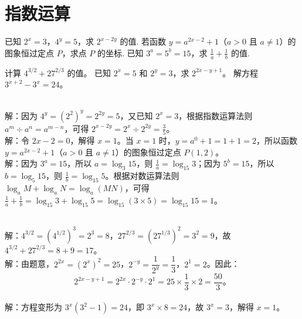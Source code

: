 \documentclass{ctexart}
\newenvironment{MyAnswer}[1][] %
{
    \begin{tcolorbox}[breakable, colframe=blue]
    \begin{Answer}[#1] \color{blue} \kaishu
        }  %
    {\end{Answer}
\end{tcolorbox}
}
\begin{document}


\section{指数运算}
\begin{Exercise}[title={指数运算小练习}, label={ex:exponent}]
    \Question 已知 $2^x = 3$，$4^y = 5$，求 $2^{x - 2y}$ 的值.
    \Question 若函数 $y = a^{2x - 2}+1$（$a>0$ 且 $a\neq1$）的图象恒过定点 $P$，求点 $P$ 的坐标.
    \Question 已知 $3^a = 5^b = 15$，求 $\frac{1}{a}+\frac{1}{b}$ 的值.

    \Question 计算 $4^{3/2} + 27^{2/3}$ 的值。
    \Question 已知 $2^x = 5$ 和 $2^y = 3$，求 $2^{2x - y + 1}$。
    \Question 解方程 $3^{x+2} - 3^x = 24$。
\end{Exercise}

\begin{MyAnswer}[ref={ex:exponent}]
    \Question {}\\ 解：因为 $4^y=(2^2)^y = 2^{2y}=5$，又已知 $2^x = 3$，根据指数运算法则 $a^m\div a^n=a^{m - n}$，可得 $2^{x - 2y}=2^x\div2^{2y}=\frac{3}{5}$。
    \Question {}\\ 解：令 $2x - 2 = 0$，解得 $x = 1$。当 $x = 1$ 时，$y=a^{0}+1=1 + 1=2$，所以函数 $y = a^{2x - 2}+1$（$a>0$ 且 $a\neq1$）的图象恒过定点 $P(1,2)$。
    \Question {}\\ 解：因为 $3^a = 15$，所以 $a=\log_3{15}$，则 $\frac{1}{a}=\log_{15}3$；因为 $5^b = 15$，所以 $b=\log_5{15}$，则 $\frac{1}{b}=\log_{15}5$。根据对数运算法则 $\log_aM+\log_aN=\log_a(MN)$，可得 $\frac{1}{a}+\frac{1}{b}=\log_{15}3+\log_{15}5=\log_{15}(3\times5)=\log_{15}15 = 1$。

    \Question {}\\ 解：$4^{3/2} = (4^{1/2})^3 = 2^3 = 8$，$27^{2/3} = (27^{1/3})^2 = 3^2 = 9$，故 $4^{3/2} + 27^{2/3} = 8 + 9 = 17$。
    \Question {}\\ 解：由题意，$2^{2x} = (2^x)^2 = 25$，$2^{-y} = \dfrac{1}{2^y} = \dfrac{1}{3}$，$2^1 = 2$。因此：
    $$
    2^{2x - y + 1} = 2^{2x} \cdot 2^{-y} \cdot 2^1 = 25 \times \dfrac{1}{3} \times 2 = \dfrac{50}{3} 。
    $$
    \Question {}\\ 解：方程变形为 $3^x (3^2 - 1) = 24$，即 $3^x \times 8 = 24$，故 $3^x = 3$，解得 $x = 1$。
\end{MyAnswer}
\end{document}
